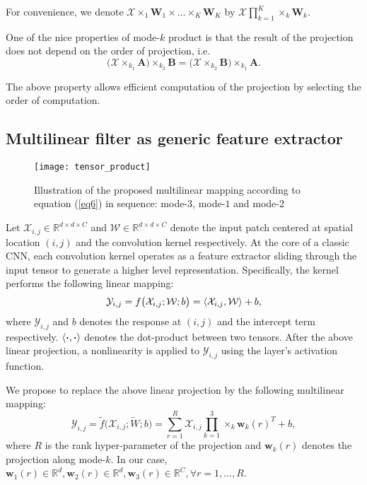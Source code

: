 \documentclass[conference,usletter]{IEEEtran}
\begin{document}
For convenience, we denote $\mathcal{X}\times_1\mathbf{W}_1\times\dots\times_K
\mathbf{W}_K$ by $\mathcal{X} \prod_{k=1}^{K}\times_k\mathbf{W}_k$.

One of the nice properties of mode-$k$ product is that the result of the projection does not depend on the order of projection, i.e.
\begin{equation}\label{eq2}
\big(\mathcal{X}\times_{k_1}\mathbf{A}\big)\times_{k_2}\mathbf{B}=\big(\mathcal{X}\times_{k_2}\mathbf{B}\big)\times_{k_1}\mathbf{A}.
\end{equation}

The above property allows efficient computation of the projection by selecting the order of computation.

\subsection{Multilinear filter as generic feature extractor}
\begin{figure*}[tp]\label{figure1}
  \centering
  \texttt{[image: tensor\_product]}
  \caption{Illustration of the proposed multilinear mapping according to equation (\ref{eq6}) in sequence: mode-$3$, mode-$1$ and mode-$2$}
\end{figure*}

Let $\mathcal{X}_{i,j}\in \mathbb{R}^{d\times d\times C}$ and $\mathcal{W}\in \mathbb{R}^{d\times d\times C}$ denote the input patch centered at spatial location $(i,j)$ and the convolution kernel respectively. At the core of a classic CNN, each convolution kernel operates as a feature extractor sliding through the input tensor to generate a higher level representation. Specifically, the kernel performs the following linear mapping:
\begin{equation}\label{eq3}
\mathcal{Y}_{i,j}=f\big(\mathcal{X}_{i,j};\mathcal{W};b\big)= \braket{\mathcal{X}_{i,j} ,\mathcal{W}} + b,
\end{equation}
where $\mathcal{Y}_{i,j}$ and $b$ denotes the response at $(i,j)$ and the intercept term respectively. $\braket{\boldsymbol{\cdot},\boldsymbol{\cdot}}$ denotes the dot-product between two tensors. After the above linear projection, a nonlinearity is applied to $\mathcal{Y}_{i,j}$ using the layer's activation function.

We propose to replace the above linear projection by the following multilinear mapping:
\begin{equation}\label{eq4}
\mathcal{Y}_{i,j}=\tilde{f}\big(\mathcal{X}_{i,j};\tilde{W};b\big)=\sum_{r=1}^{R}\mathcal{X}_{i,j}\prod_{k=1}^{3} \times_k \mathbf{w}_{k}(r)^{T} + b,
\end{equation}
where $R$ is the rank hyper-parameter of the projection and $\mathbf{w}_{k}(r)$ denotes the projection along mode-$k$. In our case, $\mathbf{w}_{1}(r) \in \mathbb{R}^{d},\mathbf{w}_{2}(r) \in \mathbb{R}^{d}, \mathbf{w}_{3}(r) \in \mathbb{R}^{C}, \forall r=1,\dots,R$.
\end{document}
